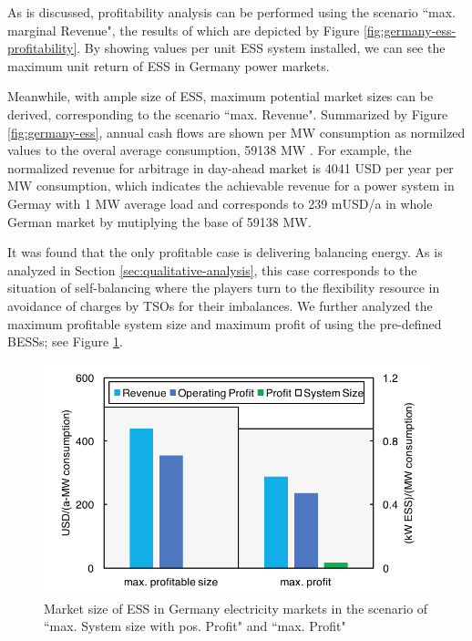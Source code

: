 As is discussed, profitability analysis can be performed using the scenario ``max. marginal Revenue", the results of which are depicted by Figure \ref{fig:germany-ess-profitability}. By showing values per unit ESS system installed, we can see the maximum unit return of ESS in Germany power markets. 

Meanwhile, with ample size of ESS, maximum potential market sizes can be derived, corresponding to the scenario ``max. Revenue".
Summarized by Figure \ref{fig:germany-ess}, annual cash flows are shown per MW consumption as normilzed values to the overal average consumption, \num{59138} MW . For example, the normalized revenue for arbitrage in day-ahead market is \num{4041} USD per year per MW consumption, which indicates the achievable revenue for a power system in Germay with 1 MW average load and corresponds to 239 mUSD/a in whole German market by mutiplying the base of \num{59138} MW.

It was found that the only profitable case is delivering balancing energy. As is analyzed in Section \ref{sec:qualitative-analysis}, this case corresponds to the situation of self-balancing where the players turn to the flexibility resource in avoidance of charges by TSOs for their imbalances. We further analyzed the maximum profitable system size and maximum profit of using the pre-defined BESSs; see Figure \ref{fig:germany-ess-profitable-size}.

\begin{figure}[h!]
	\centering
	\includegraphics[width=0.9\linewidth]{Figures/Germany_ESS_profitable_size}
	\caption{Market size of ESS in Germany electricity markets in the scenario of ``max. System size with pos. Profit" and ``max. Profit"}
	\label{fig:germany-ess-profitable-size}
\end{figure}

